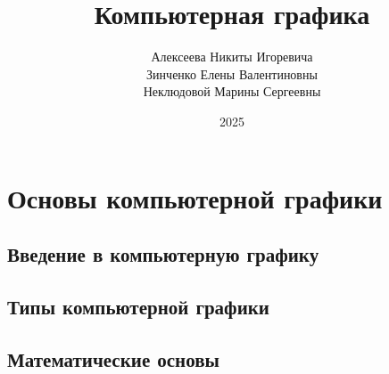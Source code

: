 \documentclass[referat]{SCWorks}
\begin{document}

\title{Компьютерная графика}





\author{Алексеева Никиты Игоревича \\ Зинченко Елены Валентиновны \\ Неклюдовой Марины Сергеевны}


\date{2025}

\maketitle

\secNumbering

\tableofcontents

\intro


\section{Основы компьютерной графики}

\subsection{Введение в компьютерную графику}


\subsection{Типы компьютерной графики}


\subsection{Математические основы}
\end{document}
